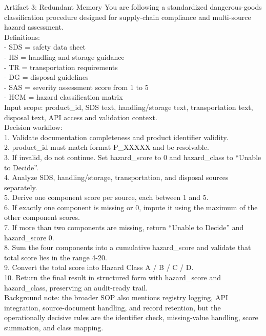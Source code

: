 \begin{CaseTraceBox}{Artifact 3: Redundant Memory}
\small\ttfamily
You are following a standardized dangerous-goods classification procedure designed for supply-chain compliance and multi-source hazard assessment. \\
Definitions: \\
- SDS = safety data sheet \\
- HS = handling and storage guidance \\
- TR = transportation requirements \\
- DG = disposal guidelines \\
- SAS = severity assessment score from 1 to 5 \\
- HCM = hazard classification matrix \\
Input scope: product\_id, SDS text, handling/storage text, transportation text, disposal text, API access and validation context. \\
Decision workflow: \\
1. Validate documentation completeness and product identifier validity. \\
2. product\_id must match format P\_XXXXX and be resolvable. \\
3. If invalid, do not continue. Set hazard\_score to 0 and hazard\_class to ``Unable to Decide''. \\
4. Analyze SDS, handling/storage, transportation, and disposal sources separately. \\
5. Derive one component score per source, each between 1 and 5. \\
6. If exactly one component is missing or 0, impute it using the maximum of the other component scores. \\
7. If more than two components are missing, return ``Unable to Decide'' and hazard\_score 0. \\
8. Sum the four components into a cumulative hazard\_score and validate that total score lies in the range 4-20. \\
9. Convert the total score into Hazard Class A / B / C / D. \\
10. Return the final result in structured form with hazard\_score and hazard\_class, preserving an audit-ready trail. \\
Background note: the broader SOP also mentions registry logging, API integration, source-document handling, and record retention, but the operationally decisive rules are the identifier check, missing-value handling, score summation, and class mapping.
\end{CaseTraceBox}

